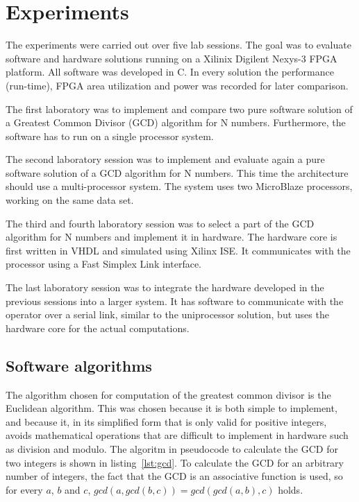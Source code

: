 \documentclass[11pt]{article}
\begin{document}
\section{Experiments\label{sec:exp}}
The experiments were carried out over five lab sessions. The goal was to evaluate software and hardware solutions running on a Xilinix Digilent Nexys-3 FPGA platform. All software was developed in C. In every solution the performance (run-time), FPGA area utilization and power was recorded for later comparison.

The first laboratory was to implement and compare two pure software solution of a Greatest Common Divisor (GCD) algorithm for N numbers. Furthermore, the software has to run on a single processor system.

The second laboratory session was to implement and evaluate again a pure software solution of a GCD algorithm for N numbers. This time the architecture should use a multi-processor system. The system uses two MicroBlaze processors, working on the same data set.

The third and fourth laboratory session was to select a part of the GCD algorithm for N numbers and implement it in hardware. The hardware core is first written in VHDL and simulated using Xilinx ISE. It communicates with the processor using a Fast Simplex Link interface\cite{fsl}.

The last laboratory session was to integrate the hardware developed in the previous sessions into a larger system. It has software to communicate with the operator over a serial link, similar to the uniprocessor solution, but uses the hardware core for the actual computations.

\subsection{Software algorithms}
The algorithm chosen for computation of the greatest common divisor is the Euclidean algorithm. This was chosen because it is both simple to implement, and because it, in its simplified form that is only valid for positive integers, avoids mathematical operations that are difficult to implement in hardware such as division and modulo. The algoritm in pseudocode to calculate the GCD for two integers is shown in listing~\ref{lst:gcd}. To calculate the GCD for an arbitrary number of integers, the fact that the GCD is an associative function is used, so for every $a$, $b$ and $c$, $gcd(a, gcd(b, c)) = gcd(gcd(a, b), c)$ holds.
\end{document}
